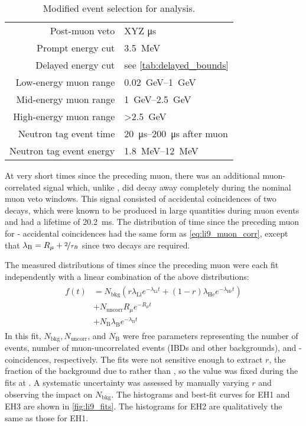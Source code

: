 \begin{table}
    \centering
    \caption{Modified event selection for \li{} analysis.}
    \label{tab:li9}
    \begin{tabular}[t]{rl}
        \toprule
        Post-muon veto & XYZ \si{\us} \\
        Prompt energy cut & \SI{3.5}{\MeV} \\
        Delayed energy cut & see \cref{tab:delayed_bounds} \\
        Low-energy muon range & \SIrange{0.02}{1}{\GeV} \\
        Mid-energy muon range & \SIrange{1}{2.5}{\GeV} \\
        High-energy muon range & \SI{>2.5}{\GeV} \\
        Neutron tag event time & \SIrange{20}{200}{\us} after muon \\
        Neutron tag event energy & \SIrange{1.8}{12}{\MeV} \\
        \bottomrule
    \end{tabular}
\end{table}

At very short times since the preceding muon,
there was an additional muon-correlated signal
which, unlike \li{}, did decay away completely
during the nominal muon veto windows.
This signal consisted of accidental coincidences
of two \boron{} decays,
which were known to be produced in large quantities
during muon events \cite{kamland_li9}
and had a lifetime of \SI{20.2}{\ms}.
The distribution of time since the preceding muon
for \boron{}-\boron{} accidental coincidences
had the same form as \cref{eq:li9_muon_corr},
except that $\lambda_\text{B} = R_\mu + \nicefrac{2}{\tau_{B}}$
since two \boron{} decays are required.

The measured distributions of times since the preceding muon
were each fit independently with a linear combination of the above distributions:
\begin{align}\label{eq:li9_fit_fn}
    \begin{split}
        f(t) &= N_\text{bkg} (r \lambda_\text{Li} e^{-\lambda_\text{Li} t}
        + (1-r) \lambda_\text{He} e^{-\lambda_\text{He} t}) \\
             &+ N_\text{uncorr} R_\mu e^{-R_\mu t} \\
             &+ N_\text{B} \lambda_\text{B} e^{-\lambda_\text{B} t}
    \end{split}
\end{align}
In this fit, $N_\text{bkg}, N_\text{uncorr}$, and $N_\text{B}$
were free parameters representing the number of \li{} events,
number of muon-uncorrelated events (IBDs and other backgrounds),
and \boron{}-\boron{} coincidences, respectively.
The fits were not sensitive enough to extract $r$,
the fraction of the background due to \li{} rather than \he{},
so the value was fixed during the fits at .
A systematic uncertainty was assessed by manually varying $r$
and observing the impact on $N_\text{bkg}$.
The histograms and best-fit curves for EH1 and EH3 are shown
in \cref{fig:li9_fits}.
The histograms for EH2 are qualitatively the same as those for EH1.

